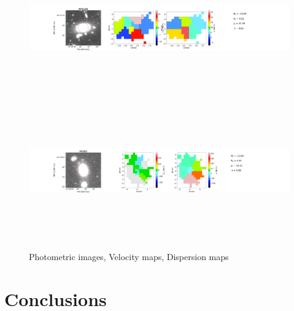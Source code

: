 \documentclass{aa}
\begin{document}
\begin{figure}[!htb]
   \includegraphics[width=21cm,height=6cm,keepaspectratio]{../2_pipeline/1_V&S_Maps/134Velocity_map.pdf}
	\includegraphics[width=21cm,height=6cm,keepaspectratio]{../2_pipeline/1_V&S_Maps/51Velocity_map.pdf}
         \caption{Photometric images, Velocity maps, Dispersion maps}
         \label{FigVelDis}
\end{figure}
\clearpage

\section{Conclusions}

  
\begin{acknowledgements}

\end{acknowledgements}


\end{document}
